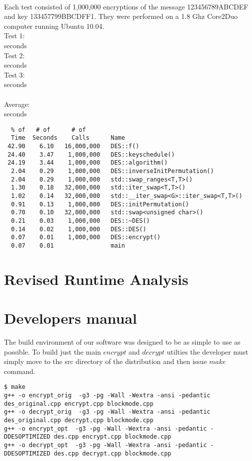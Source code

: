 \documentclass[10pt]{article}
\begin{document}
\paragraph{}Each test consisted of 1,000,000 encryptions of the message 123456789ABCDEF and key 133457799BBCDFF1. They were performed on a 1.8 Ghz Core2Duo computer running Ubuntu 10.04.
\\Test 1:
\\  seconds
\\Test 2:
\\  seconds
\\Test 3:
\\  seconds
\\\\Average:
\\  seconds
\begin{verbatim}
  % of   # of      # of                  
  Time  Seconds    Calls      Name    
 42.90    6.10   16,000,000   DES::f()
 24.40    3.47    1,000,000   DES::keyschedule()
 24.19    3.44    1,000,000   DES::algorithm()
  2.04    0.29    1,000,000   DES::inverseInitPermutation()
  2.04    0.29    1,000,000   std::swap_ranges<T,T>()
  1.30    0.18   32,000,000   std::iter_swap<T,T>()
  1.02    0.14   32,000,000   std::__iter_swap<G>::iter_swap<T,T>()
  0.91    0.13    1,000,000   DES::initPermutation()
  0.70    0.10   32,000,000   std::swap<unsigned char>()
  0.21    0.03    1,000,000   DES::~DES()
  0.14    0.02    1,000,000   DES::DES()
  0.07    0.01    1,000,000   DES::encrypt()
  0.07    0.01                main
\end{verbatim}
\section{Revised Runtime Analysis}
\section{Developers manual}

  The build environment of our software was designed to be as simple to use as possible.
  To build just the main $encrypt$ and $decrypt$ utilties the developer must simply move to the src directory of the distribution and then issue $make$ command.

{\footnotesize
\begin{verbatim}
$ make
g++ -o encrypt_orig  -g3 -pg -Wall -Wextra -ansi -pedantic des_original.cpp encrypt.cpp blockmode.cpp
g++ -o decrypt_orig  -g3 -pg -Wall -Wextra -ansi -pedantic des_original.cpp decrypt.cpp blockmode.cpp
g++ -o encrypt_opt  -g3 -pg -Wall -Wextra -ansi -pedantic -DDESOPTIMIZED des.cpp encrypt.cpp blockmode.cpp
g++ -o decrypt_opt  -g3 -pg -Wall -Wextra -ansi -pedantic -DDESOPTIMIZED des.cpp decrypt.cpp blockmode.cpp
\end{verbatim}
}
\end{document}

